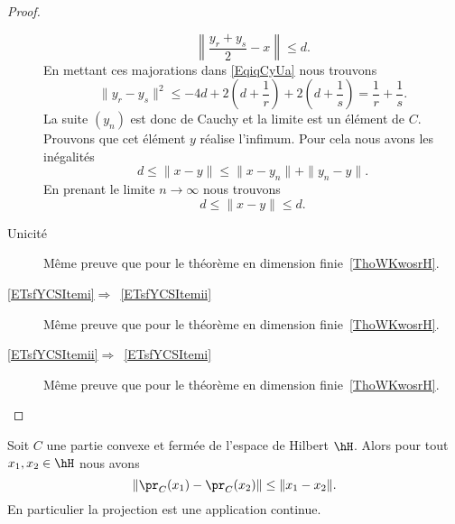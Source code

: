 \begin{proof}
\begin{description}
		      \begin{equation}
			      \left\| \frac{ y_r+y_s }{2}-x \right\| \leq d.
		      \end{equation}
		      En mettant ces majorations dans \eqref{EqiqCyUa} nous trouvons
		      \begin{equation}
			      \| y_r-y_s \|^2\leq -4d+2\left( d+\frac{1}{ r } \right)+2\left( d+\frac{1}{ s } \right)=\frac{1}{ r }+\frac{1}{ s }.
		      \end{equation}
		      La suite \( (y_n)\) est donc de Cauchy et la limite est un élément de \( C\). Prouvons que cet élément \( y\) réalise l'infimum. Pour cela nous avons les inégalités
		      \begin{equation}
			      d\leq \| x-y \|\leq\| x-y_n \|+\| y_n-y \|.
		      \end{equation}
		      En prenant le limite \( n\to\infty\) nous trouvons
		      \begin{equation}
			      d\leq \| x-y \|\leq d.
		      \end{equation}

		\item[Unicité]

		      Même preuve que pour le théorème en dimension finie~\ref{ThoWKwosrH}.

		\item[\ref{ETsfYCSItemi}\( \Rightarrow\)~\ref{ETsfYCSItemii}]

		      Même preuve que pour le théorème en dimension finie~\ref{ThoWKwosrH}.
		\item[\ref{ETsfYCSItemii}\( \Rightarrow\)~\ref{ETsfYCSItemi}]

		      Même preuve que pour le théorème en dimension finie~\ref{ThoWKwosrH}.

	\end{description}
\end{proof}

\begin{proposition}     \label{PropAXJpCe}
	Soit \( C\) une partie convexe et fermée de l'espace de Hilbert \( \hH\). Alors pour tout \( x_1,x_2\in\hH\) nous avons
	\begin{equation}
		\| \pr_C(x_1)-\pr_C(x_2) \|\leq \| x_1-x_2 \|.
	\end{equation}
	En particulier la projection est une application continue.
\end{proposition}

